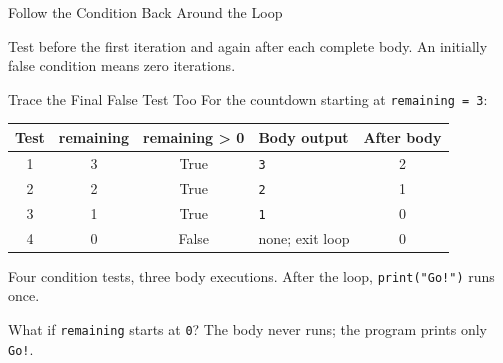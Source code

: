 \documentclass[aspectratio=169,10pt]{beamer}
\begin{document}
\begin{frame}[t]{Follow the Condition Back Around the Loop}
  \small
  \begin{center}
  \end{center}
  \begin{keyidea}
    Test before the first iteration and again after each complete body. An initially false condition means zero iterations.
  \end{keyidea}
\end{frame}

\begin{frame}[t]{Trace the Final False Test Too}
  \small
  For the countdown starting at \texttt{remaining = 3}:
  \begin{center}
    \renewcommand{\arraystretch}{1.35}
    \begin{tabular}{c|c|c|l|c}
      \textbf{Test} & \textbf{remaining} & \textbf{remaining > 0} & \textbf{Body output} & \textbf{After body}\\\hline
      1 & 3 & True & \texttt{3} & 2\\
      2 & 2 & True & \texttt{2} & 1\\
      3 & 1 & True & \texttt{1} & 0\\
      4 & 0 & False & none; exit loop & 0
    \end{tabular}
  \end{center}
  Four condition tests, three body executions. After the loop, \texttt{print("Go!")} runs once.
  \begin{activity}
    What if \texttt{remaining} starts at \texttt{0}? The body never runs; the program prints only \texttt{Go!}.
  \end{activity}
\end{frame}
\end{document}
